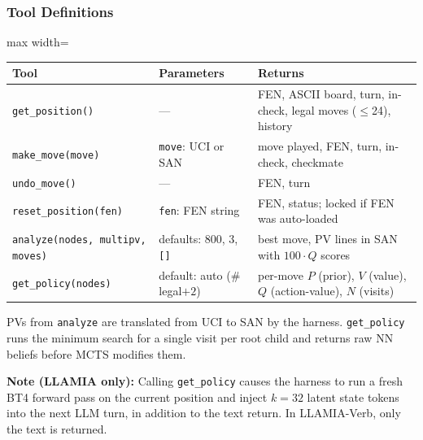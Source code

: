 \subsubsection{Tool Definitions}
\label{sec:app_toolcall_tools}
\label{sec:app_toolcall_example}

\begin{tcolorbox}[toolbox, title={Tool API Summary}]
\renewcommand{\arraystretch}{1.2}
\begin{adjustbox}{max width=\linewidth}
\begin{tabular}{@{}p{4.5cm}p{4.2cm}p{6cm}@{}}
\toprule
\textbf{Tool} & \textbf{Parameters} & \textbf{Returns} \\
\midrule
\texttt{get\_position()} & --- & FEN, ASCII board, turn, in-check, legal moves ($\leq$24), history \\
\texttt{make\_move(move)} & \texttt{move}: UCI or SAN & move played, FEN, turn, in-check, checkmate \\
\texttt{undo\_move()} & --- & FEN, turn \\
\texttt{reset\_position(fen)} & \texttt{fen}: FEN string & FEN, status; locked if FEN was auto-loaded \\
\texttt{analyze(nodes, multipv, moves)} & defaults: 800, 3, \texttt{[]} & best move, PV lines in SAN with $100\!\cdot\!Q$ scores \\
\texttt{get\_policy(nodes)} & default: auto ($\#$legal$+2$) & per-move $P$ (prior), $V$ (value), $Q$ (action-value), $N$ (visits) \\
\bottomrule
\end{tabular}
\end{adjustbox}
\smallskip

\noindent PVs from \texttt{analyze} are translated from UCI to SAN by the harness.
\texttt{get\_policy} runs the minimum search for a single visit per root child and returns
raw NN beliefs before MCTS modifies them.

\smallskip
\noindent\textbf{Note (LLAMIA only):} Calling \texttt{get\_policy} causes the harness to run a fresh BT4 forward pass on the current position
and inject $k{=}32$ latent state tokens into the next LLM turn, in addition to the text return.
In LLAMIA-Verb, only the text is returned.
\end{tcolorbox}

